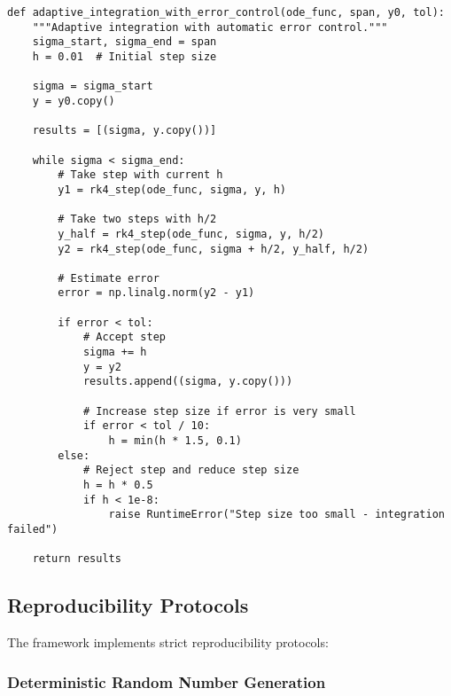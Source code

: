 \begin{verbatim}
def adaptive_integration_with_error_control(ode_func, span, y0, tol):
    """Adaptive integration with automatic error control."""
    sigma_start, sigma_end = span
    h = 0.01  # Initial step size
    
    sigma = sigma_start
    y = y0.copy()
    
    results = [(sigma, y.copy())]
    
    while sigma < sigma_end:
        # Take step with current h
        y1 = rk4_step(ode_func, sigma, y, h)
        
        # Take two steps with h/2
        y_half = rk4_step(ode_func, sigma, y, h/2)
        y2 = rk4_step(ode_func, sigma + h/2, y_half, h/2)
        
        # Estimate error
        error = np.linalg.norm(y2 - y1)
        
        if error < tol:
            # Accept step
            sigma += h
            y = y2
            results.append((sigma, y.copy()))
            
            # Increase step size if error is very small
            if error < tol / 10:
                h = min(h * 1.5, 0.1)
        else:
            # Reject step and reduce step size
            h = h * 0.5
            if h < 1e-8:
                raise RuntimeError("Step size too small - integration failed")
    
    return results
\end{verbatim}

\subsection{Reproducibility Protocols}
\label{app:reproducibility}

The framework implements strict reproducibility protocols:

\subsubsection{Deterministic Random Number Generation}

